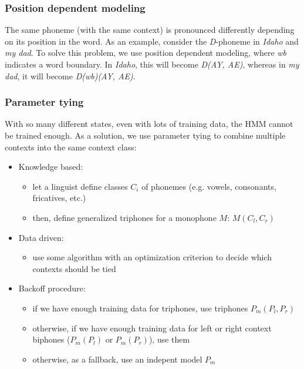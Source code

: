 \documentclass[11pt]{article}
\begin{document}
\subsubsection{Position dependent modeling}

The same phoneme (with the same context) is pronounced differently depending on its position in the word. As an example, consider the \textit{D}-phoneme in \textit{Idaho} and \textit{my dad}. To solve this problem, we use position dependent modeling, where \textit{wb} indicates a word boundary. In \textit{Idaho}, this will become \textit{D(AY, AE)}, whereas in \textit{my dad}, it will become \textit{D(wb)(AY, AE)}.

\subsubsection{Parameter tying}

With so many different states, even with lots of training data, the HMM cannot be trained enough. As a solution, we use parameter tying to combine multiple contexts into the same context class:

\begin{itemize}
    \item Knowledge based:
        \begin{itemize}
            \item let a linguist define classes $C_i$ of phonemes (e.g. vowels, consonants, fricatives, etc.)
            \item then, define generalized triphones for a monophone $M$: $M(C_l, C_r)$
        \end{itemize}
    \item Data driven:
        \begin{itemize}
            \item use some algorithm with an optimization criterion to decide which contexts should be tied
        \end{itemize}
    \item Backoff procedure:
        \begin{itemize}
            \item if we have enough training data for triphones, use triphones $P_m(P_l, P_r)$
            \item otherwise, if we have enough training data for left or right context biphones ($P_m(P_l)$ or $P_m(P_r)$), use them
            \item otherwise, as a fallback, use an indepent model $P_m$
        \end{itemize}
\end{itemize}
\end{document}
